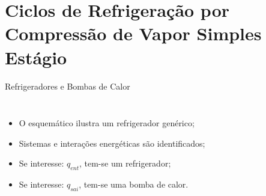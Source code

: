 
\section{Ciclos de Refrigeração por Compressão de Vapor Simples Estágio}

    \begin{frame}{Refrigeradores e Bombas de Calor}\vspace*{-0em}
        \begin{columns}
            \begin{itemize}
                \item<1-> O \alert{esquemático} ilustra um \alert{refrigerador genérico};
                    \\[\medskipamount]
                \item<1-> \alert{Sistemas} e \alert{interações energéticas} são identificados;
                    \\[\medskipamount]
                \item<2-> Se \alert{interesse}: $q_{ent}$, tem-se um \alert{refrigerador};
					\\[\medskipamount]
                \item<2-> Se \alert{interesse}: $q_{sai}$, tem-se uma \alert{bomba de calor}.
            \end{itemize}
		\end{columns}
    \end{frame}


